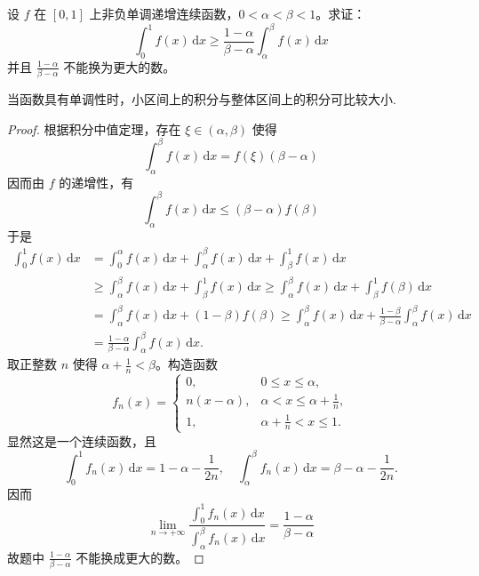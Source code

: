 \documentclass[../../main.tex]{subfiles}%
\begin{document}
\begin{example}
设 \( f \) 在 \([0,1]\) 上非负单调递增连续函数，\( 0 < \alpha < \beta < 1 \)。求证：
\[
\int_{0}^{1} f(x) \, \mathrm{d}x \geqslant \frac{1 - \alpha}{\beta - \alpha} \int_{\alpha}^{\beta} f(x) \, \mathrm{d}x
\]
并且 \( \frac{1 - \alpha}{\beta - \alpha} \) 不能换为更大的数。
\end{example}
\begin{remark}
当函数具有单调性时，小区间上的积分与整体区间上的积分可比较大小.
\end{remark}
\begin{proof}
根据积分中值定理，存在 \( \xi \in (\alpha, \beta) \) 使得
\[
\int_{\alpha}^{\beta} f(x) \, \mathrm{d}x = f(\xi)(\beta - \alpha)
\]
因而由 \( f \) 的递增性，有
\[
\int_{\alpha}^{\beta} f(x) \, \mathrm{d}x \leqslant (\beta - \alpha)f(\beta)
\]
于是
\begin{align*}
\int_{0}^{1} f(x) \, \mathrm{d}x &= \int_{0}^{\alpha} f(x) \, \mathrm{d}x + \int_{\alpha}^{\beta} f(x) \, \mathrm{d}x + \int_{\beta}^{1} f(x) \, \mathrm{d}x \\
&\geqslant \int_{\alpha}^{\beta} f(x) \, \mathrm{d}x + \int_{\beta}^{1} f(x) \, \mathrm{d}x \geqslant \int_{\alpha}^{\beta} f(x) \, \mathrm{d}x + \int_{\beta}^{1} f(\beta) \, \mathrm{d}x \\
&= \int_{\alpha}^{\beta} f(x) \, \mathrm{d}x + (1 - \beta)f(\beta) \geqslant \int_{\alpha}^{\beta} f(x) \, \mathrm{d}x + \frac{1 - \beta}{\beta - \alpha} \int_{\alpha}^{\beta} f(x) \, \mathrm{d}x \\
&= \frac{1 - \alpha}{\beta - \alpha} \int_{\alpha}^{\beta} f(x) \, \mathrm{d}x.
\end{align*}
取正整数 \( n \) 使得 \( \alpha + \frac{1}{n} < \beta \)。构造函数
\[
f_n(x) = \begin{cases} 
0, & 0 \leqslant x \leqslant \alpha, \\
n(x - \alpha), & \alpha < x \leqslant \alpha + \frac{1}{n}, \\
1, & \alpha + \frac{1}{n} < x \leqslant 1 .
\end{cases}
\]
显然这是一个连续函数，且
\[
\int_{0}^{1} f_n(x) \, \mathrm{d}x = 1 - \alpha - \frac{1}{2n}, \quad \int_{\alpha}^{\beta} f_n(x) \, \mathrm{d}x = \beta - \alpha - \frac{1}{2n}.
\]
因而
\[
\lim_{n \to +\infty} \frac{\int_{0}^{1} f_n(x) \, \mathrm{d}x}{\int_{\alpha}^{\beta} f_n(x) \, \mathrm{d}x} = \frac{1 - \alpha}{\beta - \alpha}
\]
故题中 \( \frac{1 - \alpha}{\beta - \alpha} \) 不能换成更大的数。
\end{proof}
\end{document}

